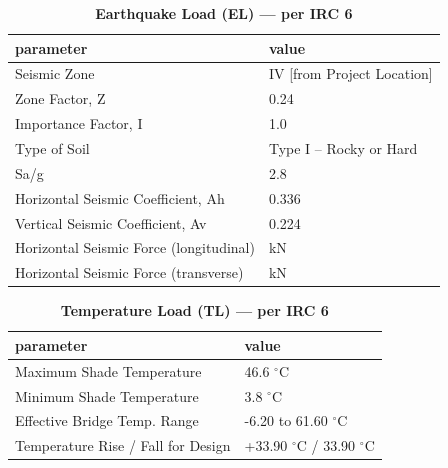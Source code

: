 \documentclass[12pt,a4paper]{report}
\numberwithin{table}{chapter}
\numberwithin{figure}{chapter}
\begin{document}
\vspace{1em}
\begin{longtable}{|L{5.5cm}|p{10.0cm}|}
\caption{\textbf{Earthquake Load (EL) --- per IRC 6}}
\hline
\textbf{parameter} & \textbf{value} \\
\hline
\textnormal{Seismic Zone} & IV [from Project Location] \\[6pt]
\hline
\textnormal{Zone Factor, Z} & 0.24 \\[6pt]
\hline
\textnormal{Importance Factor, I} & 1.0 \\[6pt]
\hline
\textnormal{Type of Soil} & Type I – Rocky or Hard \\[6pt]
\hline
\textnormal{Sa/g} & 2.8 \\[6pt]
\hline
\textnormal{Horizontal Seismic Coefficient, Ah} & 0.336 \\[6pt]
\hline
\textnormal{Vertical Seismic Coefficient, Av} & 0.224 \\[6pt]
\hline
\textnormal{Horizontal Seismic Force (longitudinal)} &  kN \\[6pt]
\hline
\textnormal{Horizontal Seismic Force (transverse)} &  kN \\[6pt]
\hline
\end{longtable}

\vspace{1em}
\begin{longtable}{|L{5.5cm}|p{10.0cm}|}
\caption{\textbf{Temperature Load (TL) --- per IRC 6}}
\hline
\textbf{parameter} & \textbf{value} \\
\hline
\textnormal{Maximum Shade Temperature} & 46.6 $^\circ$C \\[6pt]
\hline
\textnormal{Minimum Shade Temperature} & 3.8 $^\circ$C \\[6pt]
\hline
\textnormal{Effective Bridge Temp. Range} & -6.20 to 61.60 $^\circ$C \\[6pt]
\hline
\textnormal{Temperature Rise / Fall for Design} & +33.90 $^\circ$C / \textminus{}33.90 $^\circ$C \\[6pt]
\hline
\end{longtable}
\end{document}

